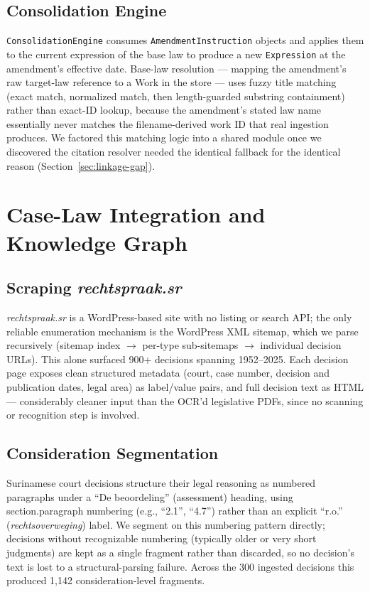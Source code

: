 \documentclass{IOS-Book-Article}
\begin{document}
\subsection{Consolidation Engine}

\texttt{ConsolidationEngine} consumes \texttt{AmendmentInstruction} objects and applies them to the current
expression of the base law to produce a new \texttt{Expression} at the amendment's effective date.
Base-law resolution --- mapping the amendment's raw target-law reference to a Work in the
store --- uses fuzzy title matching (exact match, normalized match, then length-guarded
substring containment) rather than exact-ID lookup, because the amendment's stated law name
essentially never matches the filename-derived work ID that real ingestion produces. We
factored this matching logic into a shared module once we discovered the citation resolver
needed the identical fallback for the identical reason (Section~\ref{sec:linkage-gap}).

\section{Case-Law Integration and Knowledge Graph}
\label{sec:caselaw}

\subsection{Scraping \emph{rechtspraak.sr}}
\label{sec:caselaw-scraping}

\emph{rechtspraak.sr} is a WordPress-based site with no listing or search API; the only reliable
enumeration mechanism is the WordPress XML sitemap, which we parse recursively (sitemap
index $\rightarrow$ per-type sub-sitemaps $\rightarrow$ individual decision URLs). This alone surfaced 900+
decisions spanning 1952--2025. Each decision page exposes clean structured metadata (court,
case number, decision and publication dates, legal area) as label/value pairs, and full
decision text as HTML --- considerably cleaner input than the OCR'd legislative PDFs, since
no scanning or recognition step is involved.

\subsection{Consideration Segmentation}

Surinamese court decisions structure their legal reasoning as numbered paragraphs under a
``De beoordeling'' (assessment) heading, using section.paragraph numbering (e.g., ``2.1'', ``4.7'')
rather than an explicit ``r.o.'' (\emph{rechtsoverweging}) label. We segment on this numbering
pattern directly; decisions without recognizable numbering (typically older or very short
judgments) are kept as a single fragment rather than discarded, so no decision's text is
lost to a structural-parsing failure. Across the 300 ingested decisions this produced 1,142
consideration-level fragments.
\end{document}
